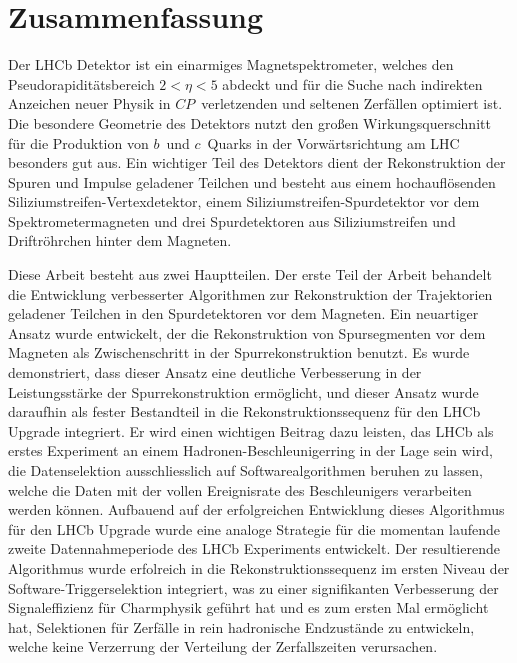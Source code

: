 \clearpage

\section*{Zusammenfassung}

Der LHCb Detektor ist ein einarmiges Magnetspektrometer, welches den
Pseudorapidit{\"a}tsbereich $2 < \eta < 5$ abdeckt und f{\"u}r die Suche nach
indirekten Anzeichen neuer Physik in $C\!P$~verletzenden und seltenen
Zerf{\"a}llen optimiert ist. Die besondere Geometrie des Detektors nutzt den
gro{\ss}en Wirkungsquerschnitt f{\"u}r die Produktion von $b$~und $c$~Quarks
in der Vorw{\"a}rtsrichtung am LHC besonders gut aus. Ein wichtiger Teil des
Detektors dient der Rekonstruktion der Spuren und Impulse geladener Teilchen
und besteht aus einem hochaufl{\"o}senden Siliziumstreifen-Vertexdetektor,
einem Siliziumstreifen-Spurdetektor vor dem Spektrometermagneten und drei
Spurdetektoren aus Siliziumstreifen und Driftr{\"o}hrchen hinter dem Magneten.

Diese Arbeit besteht aus zwei Hauptteilen. Der erste Teil der Arbeit behandelt
die Entwicklung verbesserter Algorithmen zur Rekonstruktion der Trajektorien
geladener Teilchen in den Spurdetektoren vor dem Magneten. Ein neuartiger
Ansatz wurde entwickelt, der die Rekonstruktion von Spursegmenten vor dem
Magneten als Zwischenschritt in der Spurrekonstruktion benutzt. Es wurde
demonstriert, dass dieser Ansatz eine deutliche Verbesserung in der
Leistungsst{\"a}rke der Spurrekonstruktion erm{\"o}glicht, und dieser Ansatz
wurde daraufhin als fester Bestandteil in die Rekonstruktionssequenz f{\"ur}
den LHCb Upgrade integriert. Er wird einen wichtigen Beitrag dazu leisten, das
LHCb als erstes Experiment an einem Hadronen-Beschleunigerring in der Lage
sein wird, die Datenselektion ausschliesslich auf Softwarealgorithmen beruhen
zu lassen, welche die Daten mit der vollen Ereignisrate des Beschleunigers
verarbeiten werden k{\"o}nnen.  Aufbauend auf der erfolgreichen Entwicklung
dieses Algorithmus f{\"u}r den LHCb Upgrade wurde eine analoge Strategie
f{\"u}r die momentan laufende zweite Datennahmeperiode des LHCb Experiments
entwickelt. Der resultierende Algorithmus wurde erfolreich in die
Rekonstruktionssequenz im ersten Niveau der Software-Triggerselektion
integriert, was zu einer signifikanten Verbesserung der Signaleffizienz
f{\"ur} Charmphysik gef{\"u}hrt hat und es zum ersten Mal erm{\"o}glicht hat,
Selektionen f{\"u}r Zerf{\"a}lle in rein hadronische Endzust{\"a}nde zu
entwickeln, welche keine Verzerrung der Verteilung der Zerfallszeiten
verursachen.

